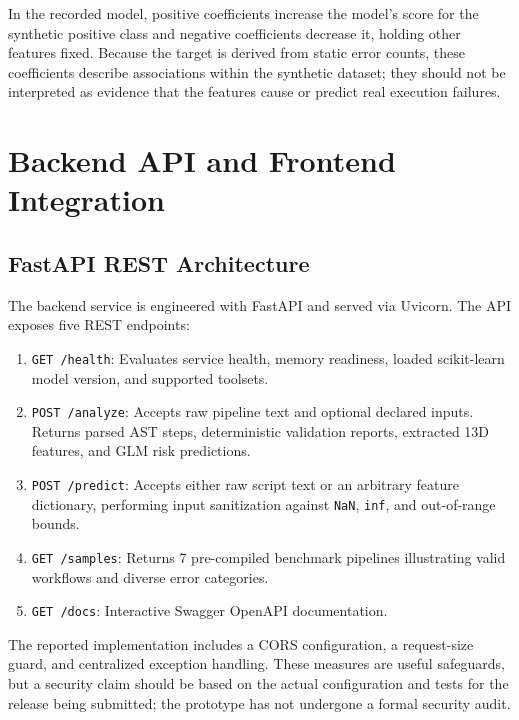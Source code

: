 \documentclass[12pt,a4paper]{article}
\begin{document}
In the recorded model, positive coefficients increase the model's score for the synthetic positive class and negative coefficients decrease it, holding other features fixed. Because the target is derived from static error counts, these coefficients describe associations within the synthetic dataset; they should not be interpreted as evidence that the features cause or predict real execution failures.

\newpage

\section{Backend API and Frontend Integration}

\subsection{FastAPI REST Architecture}

The backend service is engineered with FastAPI and served via Uvicorn. The API exposes five REST endpoints:
\begin{enumerate}
    \item \texttt{GET /health}: Evaluates service health, memory readiness, loaded scikit-learn model version, and supported toolsets.
    \item \texttt{POST /analyze}: Accepts raw pipeline text and optional declared inputs. Returns parsed AST steps, deterministic validation reports, extracted 13D features, and GLM risk predictions.
    \item \texttt{POST /predict}: Accepts either raw script text or an arbitrary feature dictionary, performing input sanitization against \texttt{NaN}, \texttt{inf}, and out-of-range bounds.
    \item \texttt{GET /samples}: Returns 7 pre-compiled benchmark pipelines illustrating valid workflows and diverse error categories.
    \item \texttt{GET /docs}: Interactive Swagger OpenAPI documentation.
\end{enumerate}

The reported implementation includes a CORS configuration, a request-size guard, and centralized exception handling. These measures are useful safeguards, but a security claim should be based on the actual configuration and tests for the release being submitted; the prototype has not undergone a formal security audit.
\end{document}
